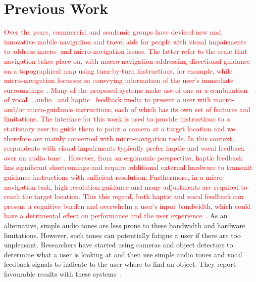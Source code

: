 \documentclass[acmsmall]{acmart}
\newcommand\hl[1]{\textcolor{red}{#1}}
\begin{document}
\section{Previous Work}\label{sec:prev-work}

\hl{Over the years, commercial and academic groups have devised new and innovative mobile navigation and travel aids for people with visual impairments to address macro- and micro-navigation issues.
  The latter refer to the scale that navigation takes place on, with macro-navigation addressing directional guidance on a topographical map using turn-by-turn instructions, for example, while micro-navigation focusses on conveying information of the user's immediate surroundings~\citep{petrie1997mobic}. 
Many of the proposed systems make use of one or a combination of vocal~\citep{mocanu2016when,chessa2016integrated,kanwal2015navigation,sato2019navcog}, audio~\citep{schwarze2015intuitive,rodriguez2012obstacle,kammoun2012navigation} and haptic~\citep{rivera-rubio2015assistive,lee2015rgb,xiao2015assistive} feedback media to present a user with macro- and/or micro-guidance instructions, each of which has its own set of features and limitations.
The interface for this work is used to provide instructions to a stationary user to guide them to point a camera at a target location and we therefore are mainly concerned with micro-navigation tools. 
In this context, respondents with visual impairments typically prefer haptic and vocal feedback over an audio tone~\citep{arditi2013user,golledge2004stated}.
However, from an ergonomic perspective, haptic feedback has significant shortcomings and require additional external hardware to transmit guidance instructions with sufficient resolution.
Furthermore, in a micro-navigation task, high-resolution guidance and many adjustments are required to reach the target location.
This this regard, both haptic and vocal feedback can present a cognitive burden and overwhelm a user's input bandwidth, which could have a detrimental effect on performance and the user experience~\citep{klatzky2006cognitive}.}
As an alternative, simple audio tones are less prone to these bandwidth and hardware limitations.
However, such tones can potentially fatigue a user if there are too unpleasant.
Researchers have started using cameras and object detectors to determine what a user is looking at and then use simple audio tones and vocal feedback signals to indicate to the user where to find an object.
They report favourable results with these systems~\citep{schauerte2012assistive,tian2013computer,fiannaca2014headlock,vazquez2012helping}.
\end{document}
